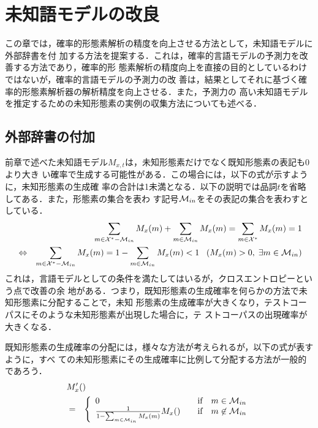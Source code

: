 \section{未知語モデルの改良}

この章では，確率的形態素解析の精度を向上させる方法として，未知語モデルに外部辞書を付
加する方法を提案する．これは，確率的言語モデルの予測力を改善する方法であり，確率的形
態素解析の精度向上を直接の目的としているわけではないが，確率的言語モデルの予測力の改
善は，結果としてそれに基づく確率的形態素解析器の解析精度を向上させる．また，予測力の
高い未知語モデルを推定するための未知形態素の実例の収集方法についても述べる．



\subsection{外部辞書の付加}

前章で述べた未知語モデル$M_{x,t}$は，未知形態素だけでなく既知形態素の表記も0より大き
い確率で生成する可能性がある．この場合には，以下の式が示すように，未知形態素の生成確
率の合計は1未満となる．以下の説明では品詞$t$を省略してある．また，形態素の集合を表わ
す記号${\cal M}_{in}$をその表記の集合を表わすとしている．
\begin{eqnarray*}
  &                 &
      \sum_{m \in {\cal X}^{*}-{\cal M}_{in}} M_{x}(m) + \sum_{m \in {\cal M}_{in}}
                                  M_{x}(m) = \sum_{m \in {\cal X}^{*}} M_{x}(m) = 1 \\
  & \Leftrightarrow &
      \sum_{m \in {\cal X}^{*}-{\cal M}_{in}} M_{x}(m)
                                         = 1 - \sum_{m \in {\cal M}_{in}} M_{x}(m) < 1
                        \;\;\; (\because M_{x}(m) > 0, \; \exists m \in {\cal M}_{in})
\end{eqnarray*}
これは，言語モデルとしての条件を満たしてはいるが，クロスエントロピーという点で改善の余
地がある．つまり，既知形態素の生成確率を何らかの方法で未知形態素に分配することで，未知
形態素の生成確率が大きくなり，テストコーパスにそのような未知形態素が出現した場合に，テ
ストコーパスの出現確率が大きくなる．

既知形態素の生成確率の分配には，様々な方法が考えられるが，以下の式が表すように，すべ
ての未知形態素にその生成確率に比例して分配する方法が一般的であろう．
\begin{eqnarray}
  \label{equation:ukwmodel3}
  \lefteqn{M_{x}^{\prime}(\Conc{x}{h})} \nonumber \\
  & = & \left\{\begin{array}{lccl}
        0 & & \mbox{if} & m \in {\cal M}_{in} \\
        \frac{1}{1-\sum_{m \in {\cal M}_{in}}M_{x}(m)}M_{x}(\Conc{x}{h})
          & & \mbox{if} & m \not\in {\cal M}_{in} \\
        \end{array}\right.
\end{eqnarray}


